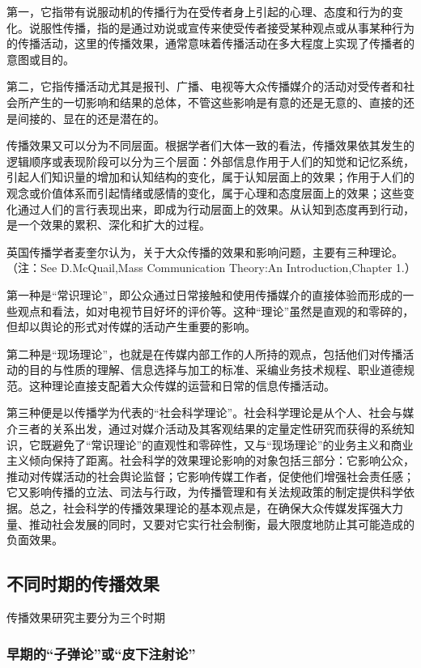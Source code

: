 \documentclass[UTF8,12pt]{ctexart}
\numberwithin{equation}{section} %
\numberwithin{figure}{section}
\numberwithin{table}{section}
\begin{document}
	第一，它指带有说服动机的传播行为在受传者身上引起的心理、态度和行为的变化。说服性传播，指的是通过劝说或宣传来使受传者接受某种观点或从事某种行为的传播活动，这里的传播效果，通常意味着传播活动在多大程度上实现了传播者的意图或目的。
	
	第二，它指传播活动尤其是报刊、广播、电视等大众传播媒介的活动对受传者和社会所产生的一切影响和结果的总体，不管这些影响是有意的还是无意的、直接的还是间接的、显在的还是潜在的。
	
	传播效果又可以分为不同层面。根据学者们大体一致的看法，传播效果依其发生的逻辑顺序或表现阶段可以分为三个层面：外部信息作用于人们的知觉和记忆系统，引起人们知识量的增加和认知结构的变化，属于认知层面上的效果；作用于人们的观念或价值体系而引起情绪或感情的变化，属于心理和态度层面上的效果；这些变化通过人们的言行表现出来，即成为行动层面上的效果。从认知到态度再到行动，是一个效果的累积、深化和扩大的过程。
	
	英国传播学者麦奎尔认为，关于大众传播的效果和影响问题，主要有三种理论。（注：See D.McQuail,Mass Communication Theory:An Introduction,Chapter 1.）
	
	第一种是“常识理论”，即公众通过日常接触和使用传播媒介的直接体验而形成的一些观点和看法，如对电视节目好坏的评价等。这种“理论”虽然是直观的和零碎的，但却以舆论的形式对传媒的活动产生重要的影响。
	
	第二种是“现场理论”，也就是在传媒内部工作的人所持的观点，包括他们对传播活动的目的与性质的理解、信息选择与加工的标准、采编业务技术规程、职业道德规范。这种理论直接支配着大众传媒的运营和日常的信息传播活动。
	
	第三种便是以传播学为代表的“社会科学理论”。社会科学理论是从个人、社会与媒介三者的关系出发，通过对媒介活动及其客观结果的定量定性研究而获得的系统知识，它既避免了“常识理论”的直观性和零碎性，又与“现场理论”的业务主义和商业主义倾向保持了距离。社会科学的效果理论影响的对象包括三部分：它影响公众，推动对传媒活动的社会舆论监督；它影响传媒工作者，促使他们增强社会责任感；它又影响传播的立法、司法与行政，为传播管理和有关法规政策的制定提供科学依据。总之，社会科学的传播效果理论的基本观点是，在确保大众传媒发挥强大力量、推动社会发展的同时，又要对它实行社会制衡，最大限度地防止其可能造成的负面效果。
	
	\subsection{不同时期的传播效果}
	
	传播效果研究主要分为三个时期
	
	\subsubsection{早期的“子弹论”或“皮下注射论”}
	
\end{document}
